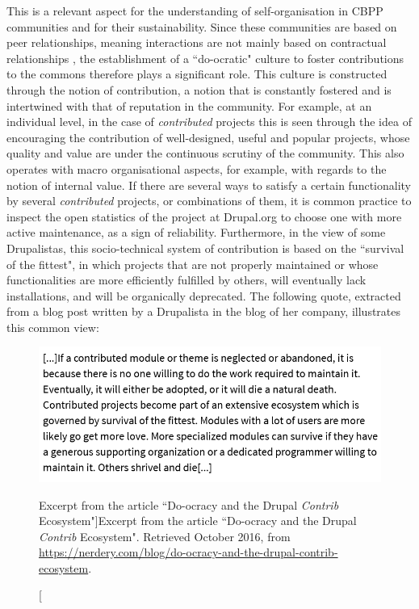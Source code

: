 This is a relevant aspect for the understanding of self-organisation in CBPP communities and for their sustainability. Since these communities are based on peer relationships, meaning interactions are not mainly based on contractual relationships \parencite{morell2016mayo}, the establishment of a ``do-ocratic" culture to foster contributions to the commons therefore plays a significant role. This culture is constructed through the notion of contribution, a notion that is constantly fostered and is intertwined with that of reputation in the community. For example, at an individual level, in the case of \textit{contributed} projects this is seen through the idea of encouraging the contribution of well-designed, useful and popular projects, whose quality and value are under the continuous scrutiny of the community. This also operates with macro organisational aspects, for example, with regards to the notion of internal value. If there are several ways to satisfy a certain functionality by several \textit{contributed} projects, or combinations of them, it is common practice to inspect the open statistics of the project at Drupal.org to choose one with more active maintenance, as a sign of reliability. Furthermore, in the view of some Drupalistas, this socio-technical system of contribution is based on the ``survival of the fittest", in which projects that are not properly maintained or whose functionalities are more efficiently fulfilled by others, will eventually lack installations, and will be organically deprecated. The following quote, extracted from a blog post written by a Drupalista in the blog of her company, illustrates this common view:

\begin{figure}[H]
 \centering
 \includegraphics[scale=0.5]{img/quotes_replacement/quote_nerdery.png}
	\caption[Excerpt from the article ``Do-ocracy and the Drupal \textit{Contrib} Ecosystem"]{Excerpt from the article ``Do-ocracy and the Drupal \textit{Contrib} Ecosystem". Retrieved  October 2016, from \url{https://nerdery.com/blog/do-ocracy-and-the-drupal-contrib-ecosystem}.}
   \label{quote_nerdery}
\end{figure}

